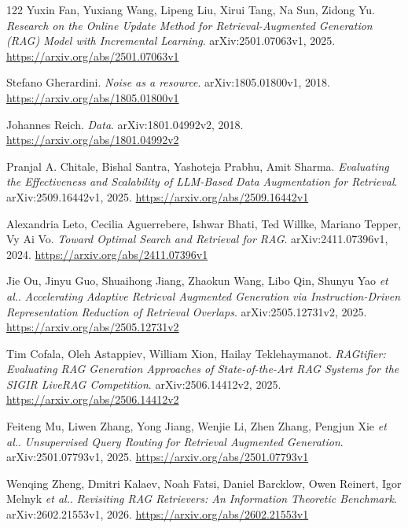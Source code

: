 \documentclass[11pt,a4paper]{article}
\begin{document}
\begin{thebibliography}{122}
Yuxin Fan, Yuxiang Wang, Lipeng Liu, Xirui Tang, Na Sun, Zidong Yu.
\newblock \emph{Research on the Online Update Method for Retrieval-Augmented Generation (RAG) Model with Incremental Learning}.
\newblock arXiv:2501.07063v1, 2025.
\newblock \url{https://arxiv.org/abs/2501.07063v1}

Stefano Gherardini.
\newblock \emph{Noise as a resource}.
\newblock arXiv:1805.01800v1, 2018.
\newblock \url{https://arxiv.org/abs/1805.01800v1}

Johannes Reich.
\newblock \emph{Data}.
\newblock arXiv:1801.04992v2, 2018.
\newblock \url{https://arxiv.org/abs/1801.04992v2}

Pranjal A. Chitale, Bishal Santra, Yashoteja Prabhu, Amit Sharma.
\newblock \emph{Evaluating the Effectiveness and Scalability of LLM-Based Data Augmentation for Retrieval}.
\newblock arXiv:2509.16442v1, 2025.
\newblock \url{https://arxiv.org/abs/2509.16442v1}

Alexandria Leto, Cecilia Aguerrebere, Ishwar Bhati, Ted Willke, Mariano Tepper, Vy Ai Vo.
\newblock \emph{Toward Optimal Search and Retrieval for RAG}.
\newblock arXiv:2411.07396v1, 2024.
\newblock \url{https://arxiv.org/abs/2411.07396v1}

Jie Ou, Jinyu Guo, Shuaihong Jiang, Zhaokun Wang, Libo Qin, Shunyu Yao \emph{et al.}.
\newblock \emph{Accelerating Adaptive Retrieval Augmented Generation via Instruction-Driven Representation Reduction of Retrieval Overlaps}.
\newblock arXiv:2505.12731v2, 2025.
\newblock \url{https://arxiv.org/abs/2505.12731v2}

Tim Cofala, Oleh Astappiev, William Xion, Hailay Teklehaymanot.
\newblock \emph{RAGtifier: Evaluating RAG Generation Approaches of State-of-the-Art RAG Systems for the SIGIR LiveRAG Competition}.
\newblock arXiv:2506.14412v2, 2025.
\newblock \url{https://arxiv.org/abs/2506.14412v2}

Feiteng Mu, Liwen Zhang, Yong Jiang, Wenjie Li, Zhen Zhang, Pengjun Xie \emph{et al.}.
\newblock \emph{Unsupervised Query Routing for Retrieval Augmented Generation}.
\newblock arXiv:2501.07793v1, 2025.
\newblock \url{https://arxiv.org/abs/2501.07793v1}

Wenqing Zheng, Dmitri Kalaev, Noah Fatsi, Daniel Barcklow, Owen Reinert, Igor Melnyk \emph{et al.}.
\newblock \emph{Revisiting RAG Retrievers: An Information Theoretic Benchmark}.
\newblock arXiv:2602.21553v1, 2026.
\newblock \url{https://arxiv.org/abs/2602.21553v1}


\end{thebibliography}
\end{document}

